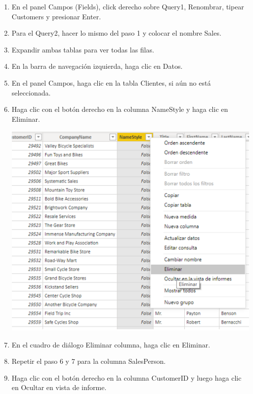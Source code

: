 \documentclass[12pt,letterpaper]{article}
\begin{document}
\begin{enumerate}
	\item En el panel Campos (Fields), click derecho sobre Query1, Renombrar, tipear Customers y presionar Enter.
	
    \item Para el Query2, hacer lo mismo del paso 1 y colocar el nombre Sales.
    \item Expandir ambas tablas para ver todas las filas.
    
  
    \item  En la barra de navegación izquierda, haga clic en Datos.
  
    \item En el panel Campos, haga clic en la tabla Clientes, si aún no está seleccionada.
    
    \item Haga clic con el botón derecho en la columna NameStyle y haga clic en Eliminar.

    \begin{center}
	\includegraphics[width=13cm]{./Imagenes/4}
	\end{center}
    \item En el cuadro de diálogo Eliminar columna, haga clic en Eliminar.

    \item Repetir el paso 6 y 7 para la columna SalesPerson.
    
     
    
    \item Haga clic con el botón derecho en la columna CustomerID y luego haga clic en Ocultar en vista de informe.
    

\end{enumerate}
\end{document}
